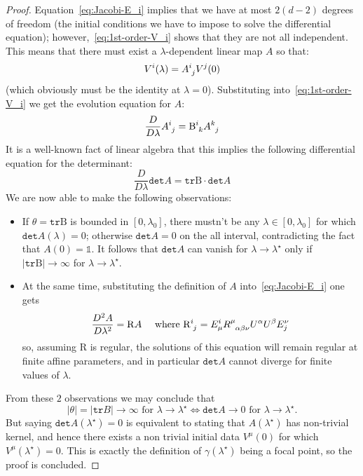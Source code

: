 \begin{proof}
		Equation~\eqref{eq:Jacobi-E_i} implies that we have at most \(2(d - 2)\) degrees of freedom (the initial conditions we have to impose to solve the differential equation); however,~\eqref{eq:1st-order-V_i} shows that they are not all independent. This means that there must exist a \(\lambda\)-dependent linear map \(A\) so that:
		\[
		V^i(\lambda) = A\indices{^i_j}V^j(0)
		\]
		(which obviously must be the identity at \(\lambda = 0\)).
		Substituting into~\eqref{eq:1st-order-V_i} we get the evolution equation for \(A\):
		\[
		\frac{D}{D\lambda}A\indices{^i_j} = \mathrm{B}\indices{^i_k}A\indices{^k_j}
		\]
		It is a well-known fact of linear algebra that this implies the following differential equation for the determinant: %
		\begin{equation}
		\label{eq;det-A}
			\frac{D}{D\lambda}\texttt{det}A = \texttt{tr}\mathrm{B}\cdot \texttt{det}A 
		\end{equation}
		We are now able to make the following observations:
		\begin{itemize}
			\item[\ding{99}] If \(\theta = \texttt{tr}\mathrm{B}\) is bounded in \([0, \lambda_0]\), there mustn't be any \(\lambda \in [0, \lambda_0]\) for which \(\texttt{det}A(\lambda) = 0\); otherwise \(\texttt{det}A = 0\) on the all interval, contradicting the fact that \(A(0) = \mathbb{1}\). It follows that \(\texttt{det}A\) can vanish for \(\lambda \rightarrow \lambda^{\star}\) only if \(\vert\texttt{tr}\mathrm{B}\vert \rightarrow \infty\) for \(\lambda \rightarrow \lambda^{\star}\).
			\item[\ding{99}] At the same time, substituting the definition of \(A\) into~\eqref{eq:Jacobi-E_i} one gets
			\[
			\frac{D^2 A}{D\lambda^2} = \mathrm{R}A \quad \text{ where } \mathrm{R}\indices{^i_j} = E^i_{\mu}R\indices{^{\mu}_{\alpha\beta\nu}}U^{\alpha}U^{\beta}E_j^{\nu}
			\]
			so, assuming \(\mathrm{R}\) is regular, the solutions of this equation will remain regular at finite affine parameters, and in particular \(\texttt{det}A\) cannot diverge for finite values of \(\lambda\). 
		\end{itemize}
		From these \(2\) observations we may conclude that
		\[
		\vert\theta\vert = \vert\texttt{tr}B\vert \rightarrow \infty \text{ for } \lambda \rightarrow \lambda^{\star}\iff \texttt{det}A \rightarrow 0 \text{ for } \lambda \rightarrow \lambda^{\star}.
		\]
		But saying \(\texttt{det}A(\lambda^{\star}) = 0 \) is equivalent to stating that \(A(\lambda^{\star}) \) has non-trivial kernel, and hence there exists a non trivial initial data \(V^{\mu}(0)\) for which \(V^{\mu}(\lambda^{\star}) = 0\). This is exactly the definition of \(\gamma(\lambda^{\star})\) being a focal point, so the proof is concluded.
	\end{proof}

